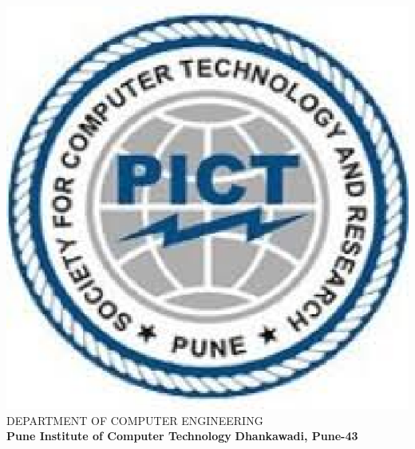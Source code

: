 \documentclass[a4paper, 12pt]{article}
\begin{document}
\begin{titlepage}
\begin{center}
	\includegraphics[scale=0.6]{pict} 
	\linebreak
	\Large
        DEPARTMENT OF COMPUTER ENGINEERING\\
        \textbf{Pune Institute of Computer Technology}
		\linebreak
		\textbf{Dhankawadi, Pune-43}
		\vspace{0.8cm}
		\Large
		

\end{center}
\end{titlepage}
\end{document}
